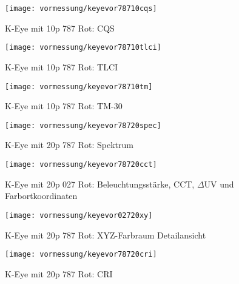 \documentclass[pagesize,paper=A4,fontsize=12pt,utf8,numbers=noenddot,bibliography=totoc,listof=totoc,DIV=11,BCOR=1mm]{scrreprt}
\begin{document}
\begin{figure}[htp]     %
\centering
\texttt{[image: vormessung/keyevor78710cqs]} 
\caption {K-Eye mit 10p 787 Rot: CQS} 
\end{figure}

\begin{figure}[htp]     %
\centering
\texttt{[image: vormessung/keyevor78710tlci]} 
\caption {K-Eye mit 10p 787 Rot: TLCI} 
\end{figure}

\begin{figure}[htp]     %
\centering
\texttt{[image: vormessung/keyevor78710tm]} 
\caption {K-Eye mit 10p 787 Rot: TM-30} 
\end{figure}




\begin{figure}[htp]     %
\centering
\texttt{[image: vormessung/keyevor78720spec]} 
\caption {K-Eye mit 20p 787 Rot: Spektrum} 
\end{figure}

\begin{figure}[htp]     %
\centering
\texttt{[image: vormessung/keyevor78720cct]} 
\caption {K-Eye mit 20p 027 Rot: Beleuchtungsstärke, CCT, $\Delta$UV und Farbortkoordinaten} 
\end{figure}

\begin{figure}[htp]     %
\centering
\texttt{[image: vormessung/keyevor02720xy]} 
\caption {K-Eye mit 20p 787 Rot: XYZ-Farbraum Detailansicht} 
\end{figure}

\begin{figure}[htp]     %
\centering
\texttt{[image: vormessung/keyevor78720cri]} 
\caption {K-Eye mit 20p 787 Rot: CRI} 
\end{figure}
\end{document}
